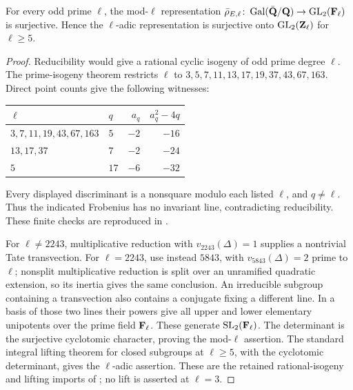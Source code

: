 \begin{theorem}\label{thm:image}
For every odd prime $\ell$, the mod-$\ell$ representation $\bar\rho_{E,\ell}\colon\operatorname{Gal}(\bar{\mathbf{Q}}/\mathbf{Q})\to\operatorname{GL}_2(\mathbf{F}_\ell)$ is surjective. Hence the $\ell$-adic representation is surjective onto $\operatorname{GL}_2(\mathbf{Z}_\ell)$ for $\ell\ge5$.
\end{theorem}
\begin{proof}
Reducibility would give a rational cyclic isogeny of odd prime degree $\ell$. The prime-isogeny theorem restricts $\ell$ to $3,5,7,11,13,17,19,37,43,67,163$. Direct point counts give the following witnesses:
\begin{center}\begin{tabular}{@{}llrr@{}}\toprule
$\ell$ & $q$ & $a_q$ & $a_q^2-4q$\\\midrule
$3,7,11,19,43,67,163$ & $5$ & $-2$ & $-16$\\
$13,17,37$ & $7$ & $-2$ & $-24$\\
$5$ & $17$ & $-6$ & $-32$\\\bottomrule
\end{tabular}\end{center}
Every displayed discriminant is a nonsquare modulo each listed $\ell$, and $q\ne\ell$. Thus the indicated Frobenius has no invariant line, contradicting reducibility. These finite checks are reproduced in .

For $\ell\ne2243$, multiplicative reduction with $v_{2243}(\Delta)=1$ supplies a nontrivial Tate transvection. For $\ell=2243$, use instead $5843$, with $v_{5843}(\Delta)=2$ prime to $\ell$; nonsplit multiplicative reduction is split over an unramified quadratic extension, so its inertia gives the same conclusion. An irreducible subgroup containing a transvection also contains a conjugate fixing a different line. In a basis of those two lines their powers give all upper and lower elementary unipotents over the prime field $\mathbf{F}_\ell$. These generate $\mathrm{SL}_2(\mathbf{F}_\ell)$. The determinant is the surjective cyclotomic character, proving the mod-$\ell$ assertion. The standard integral lifting theorem for closed subgroups at $\ell\ge5$, with the cyclotomic determinant, gives the $\ell$-adic assertion. These are the retained rational-isogeny and lifting imports of ; no lift is asserted at $\ell=3$.
\end{proof}

